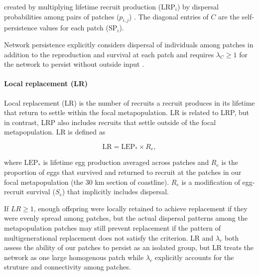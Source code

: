 \documentclass[12pt, oneside]{article}   	%
\begin{document}
created by multiplying lifetime recruit production ($\text{LRP}_i$) by dispersal probabilities among pairs of patches ($p_{i,j}$) \citep{burgess2014beyond}. The diagonal entries of $C$ are the self-persistence values for each patch ($\text{SP}_i$).

Network persistence explicitly considers dispersal of individuals among patches in addition to the reproduction and survival at each patch and requires $\lambda_C \geq 1$ for the network to persist without outside input \citep{hastings_persistence_2006, white_population_2010, burgess2014beyond}.

\paragraph*{Local replacement (LR)}

Local replacement (LR) is the number of recruits a recruit produces in its lifetime that return to settle within the focal metapopulation. LR is related to LRP, but in contrast, LRP also includes recruits that settle outside of the focal metapopulation. LR is defined as 

\begin{equation}
\text{LR} = \text{LEP}_* \times R_e, \label{EQN_LR}
\end{equation}

where $\text{LEP}_*$ is lifetime egg production averaged across patches and $R_e$ is the proportion of eggs that survived and returned to recruit at the patches in our focal metapopulation (the 30 km section of coastline). $R_e$ is a modification of egg-recruit survival ($S_e$) that implicitly includes dispersal. 

If $LR \geq 1$, enough offspring were locally retained to achieve replacement if they were evenly spread among patches, but the actual dispersal patterns among the metapopulation patches may still prevent replacement if the pattern of multigenerational replacement does not satisfy the \cite{hastings_persistence_2006} criterion. LR and $\lambda_c$ both assess the ability of our patches to persist as an isolated group, but LR treats the network as one large homogenous patch while $\lambda_c$ explicitly accounts for the struture and connectivity among patches.  
\end{document}
